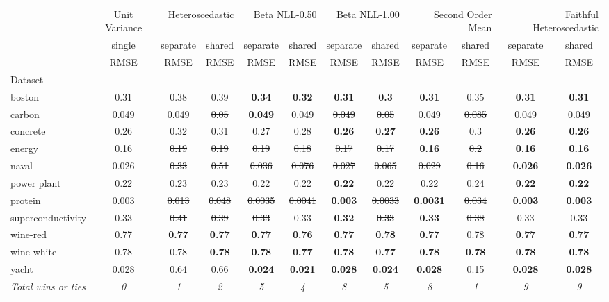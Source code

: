 \begin{tabular}{l|c|cc|cc|cc|cc|cc}
\toprule
{} & {Unit Variance} & \multicolumn{2}{r}{Heteroscedastic} & \multicolumn{2}{r}{Beta NLL-0.50} & \multicolumn{2}{r}{Beta NLL-1.00} & \multicolumn{2}{r}{Second Order Mean} & \multicolumn{2}{r}{Faithful Heteroscedastic} \\
{} & {single} & {separate} & {shared} & {separate} & {shared} & {separate} & {shared} & {separate} & {shared} & {separate} & {shared} \\
{} & {RMSE} & {RMSE} & {RMSE} & {RMSE} & {RMSE} & {RMSE} & {RMSE} & {RMSE} & {RMSE} & {RMSE} & {RMSE} \\
{Dataset} & {} & {} & {} & {} & {} & {} & {} & {} & {} & {} & {} \\
\midrule
boston & 0.31 & \sout{0.38} & \sout{0.39} & \textbf{0.34} & \textbf{0.32} & \textbf{0.31} & \textbf{0.3} & \textbf{0.31} & \sout{0.35} & \textbf{0.31} & \textbf{0.31} \\
carbon & 0.049 & 0.049 & \sout{0.05} & \textbf{0.049} & 0.049 & \sout{0.049} & \sout{0.05} & 0.049 & \sout{0.085} & 0.049 & 0.049 \\
concrete & 0.26 & \sout{0.32} & \sout{0.31} & \sout{0.27} & \sout{0.28} & \textbf{0.26} & \textbf{0.27} & \textbf{0.26} & \sout{0.3} & \textbf{0.26} & \textbf{0.26} \\
energy & 0.16 & \sout{0.19} & \sout{0.19} & \sout{0.19} & \sout{0.18} & \sout{0.17} & \sout{0.17} & \textbf{0.16} & \sout{0.2} & \textbf{0.16} & \textbf{0.16} \\
naval & 0.026 & \sout{0.33} & \sout{0.51} & \sout{0.036} & \sout{0.076} & \sout{0.027} & \sout{0.065} & \sout{0.029} & \sout{0.16} & \textbf{0.026} & \textbf{0.026} \\
power plant & 0.22 & \sout{0.23} & \sout{0.23} & \sout{0.22} & \sout{0.22} & \textbf{0.22} & \sout{0.22} & \sout{0.22} & \sout{0.24} & \textbf{0.22} & \textbf{0.22} \\
protein & 0.003 & \sout{0.013} & \sout{0.048} & \sout{0.0035} & \sout{0.0041} & \textbf{0.003} & \sout{0.0033} & \textbf{0.0031} & \sout{0.034} & \textbf{0.003} & \textbf{0.003} \\
superconductivity & 0.33 & \sout{0.41} & \sout{0.39} & \sout{0.33} & 0.33 & \textbf{0.32} & \sout{0.33} & \textbf{0.33} & \sout{0.38} & 0.33 & 0.33 \\
wine-red & 0.77 & \textbf{0.77} & \textbf{0.77} & \textbf{0.77} & \textbf{0.76} & \textbf{0.77} & \textbf{0.78} & \textbf{0.77} & 0.78 & \textbf{0.77} & \textbf{0.77} \\
wine-white & 0.78 & 0.78 & \textbf{0.78} & \textbf{0.78} & \textbf{0.77} & \textbf{0.78} & \textbf{0.77} & \textbf{0.78} & \textbf{0.78} & \textbf{0.78} & \textbf{0.78} \\
yacht & 0.028 & \sout{0.64} & \sout{0.66} & \textbf{0.024} & \textbf{0.021} & \textbf{0.028} & \textbf{0.024} & \textbf{0.028} & \sout{0.15} & \textbf{0.028} & \textbf{0.028} \\
\textit{{Total wins or ties}} & \textit{0} & \textit{1} & \textit{2} & \textit{5} & \textit{4} & \textit{8} & \textit{5} & \textit{8} & \textit{1} & \textit{9} & \textit{9} \\
\bottomrule
\end{tabular}
